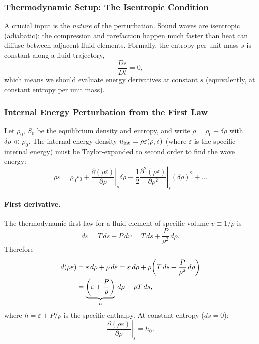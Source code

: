 \subsubsection*{Thermodynamic Setup: The Isentropic Condition}

A crucial input is the \emph{nature} of the perturbation. Sound waves are
isentropic (adiabatic): the compression and rarefaction happen much faster than
heat can diffuse between adjacent fluid elements. Formally, the entropy per
unit mass $s$ is constant along a fluid trajectory,
\begin{equation}
    \frac{Ds}{Dt} = 0,
    \label{eq:lec10:isentropic}
\end{equation}
which means we should evaluate energy derivatives at constant $s$ (equivalently,
at constant entropy per unit mass).

\subsubsection*{Internal Energy Perturbation from the First Law}

Let $\rho_0,\,S_0$ be the equilibrium density and entropy, and write
$\rho = \rho_0 + \delta\rho$ with $\delta\rho \ll \rho_0$. The internal energy
density $u_{\rm int} = \rho\varepsilon(\rho,s)$ (where $\varepsilon$ is the
specific internal energy) must be Taylor-expanded to second order to find the
wave energy:
\begin{equation}
    \rho\varepsilon
    =
    \rho_0\varepsilon_0
    +
    \left.\frac{\partial(\rho\varepsilon)}{\partial\rho}\right|_s\delta\rho
    +
    \frac{1}{2}\left.\frac{\partial^2(\rho\varepsilon)}{\partial\rho^2}\right|_s
    (\delta\rho)^2
    +\ldots
    \label{eq:lec10:uexpand}
\end{equation}

\paragraph{First derivative.}
The thermodynamic first law for a fluid element of specific volume
$v\equiv1/\rho$ is
\begin{equation}
    d\varepsilon = T\,ds - P\,dv = T\,ds + \frac{P}{\rho^2}\,d\rho.
    \label{eq:lec10:firstlaw}
\end{equation}
Therefore
\begin{align}
    d(\rho\varepsilon)
    &= \varepsilon\,d\rho + \rho\,d\varepsilon
    = \varepsilon\,d\rho + \rho\!\left(T\,ds + \frac{P}{\rho^2}\,d\rho\right)
    \notag\\
    &= \underbrace{\left(\varepsilon + \frac{P}{\rho}\right)}_{h}\,d\rho
      + \rho T\,ds,
    \label{eq:lec10:drhoeps}
\end{align}
where $h = \varepsilon + P/\rho$ is the specific enthalpy. At constant entropy
($ds=0$):
\begin{equation}
    \left.\frac{\partial(\rho\varepsilon)}{\partial\rho}\right|_s = h_0.
    \label{eq:lec10:d1}
\end{equation}

